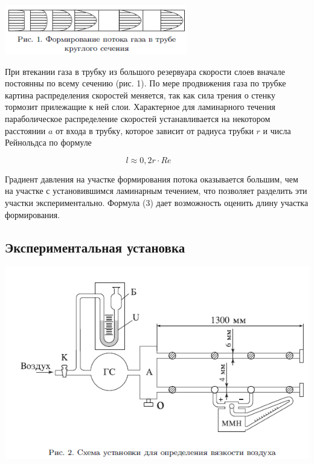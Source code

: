 \documentclass[a4paper, 12pt]{article} %
\begin{document}
\begin{center}
		\includegraphics[width = 0.6\textwidth]{133_1}
\end{center}

При втекании газа в трубку из большого резервуара скорости слоев вначале постоянны по всему сечению (рис. 1). По мере продвижения газа по трубке картина распределения скоростей меняется, так как сила трения о стенку тормозит прилежащие к ней слои. Характерное для ламинарного течения параболическое распределение скоростей устанавливается на некотором расстоянии $a$ от входа в трубку, которое зависит от радиуса трубки $r$ и числа Рейнольдса по формуле

\begin{equation}
	l \approx  0,2 r \cdot Re \text{ } \text{ } \text{ }
\end{equation}

Градиент давления на участке формирования потока оказывается большим, чем на участке с установившимся ламинарным течением, что позволяет разделить эти участки экспериментально. Формула (3) дает возможность оценить длину участка формирования.


\subsection{Экспериментальная установка}

\begin{center}
    \includegraphics[width = \textwidth]{133_2.png}
\end{center}
\end{document}
